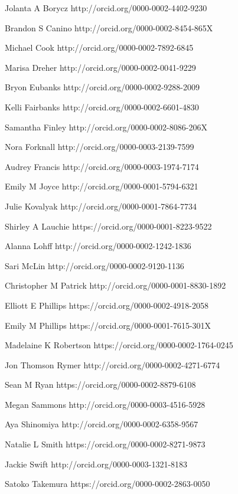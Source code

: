 \documentclass{article}
\begin{document}
\noindent Jolanta A Borycz http://orcid.org/0000-0002-4402-9230\par
\noindent Brandon S Canino http://orcid.org/0000-0002-8454-865X\par
\noindent Michael Cook http://orcid.org/0000-0002-7892-6845\par
\noindent Marisa Dreher http://orcid.org/0000-0002-0041-9229\par
\noindent Bryon Eubanks http://orcid.org/0000-0002-9288-2009\par
\noindent Kelli Fairbanks http://orcid.org/0000-0002-6601-4830\par
\noindent Samantha Finley http://orcid.org/0000-0002-8086-206X\par
\noindent Nora Forknall http://orcid.org/0000-0003-2139-7599\par
\noindent Audrey Francis http://orcid.org/0000-0003-1974-7174\par
\noindent Emily M Joyce http://orcid.org/0000-0001-5794-6321\par
\noindent Julie Kovalyak http://orcid.org/0000-0001-7864-7734\par
\noindent Shirley A Lauchie https://orcid.org/0000-0001-8223-9522\par
\noindent Alanna Lohff http://orcid.org/0000-0002-1242-1836\par
\noindent Sari McLin http://orcid.org/0000-0002-9120-1136\par
\noindent Christopher M Patrick http://orcid.org/0000-0001-8830-1892\par
\noindent Elliott E Phillips https://orcid.org/0000-0002-4918-2058\par
\noindent Emily M Phillips https://orcid.org/0000-0001-7615-301X\par
\noindent Madelaine K Robertson https://orcid.org/0000-0002-1764-0245\par
\noindent Jon Thomson Rymer http://orcid.org/0000-0002-4271-6774\par
\noindent Sean M Ryan https://orcid.org/0000-0002-8879-6108\par
\noindent Megan Sammons http://orcid.org/0000-0003-4516-5928\par
\noindent Aya Shinomiya http://orcid.org/0000-0002-6358-9567\par
\noindent Natalie L Smith https://orcid.org/0000-0002-8271-9873\par
{}
\noindent Jackie Swift http://orcid.org/0000-0003-1321-8183\par
\noindent Satoko Takemura https://orcid.org/0000-0002-2863-0050\par
\end{document}
